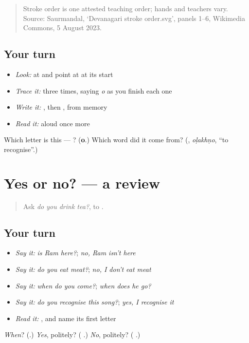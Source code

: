 \begin{quote}
Stroke order is one attested teaching order; hands and teachers vary. Source: Saurmandal, ‘Devanagari  stroke order.svg’, panels 1–6, Wikimedia Commons, 5 August 2023.
\end{quote}

\subsection*{Your turn}
\begin{itemize}
\raggedright
  \item \emph{Look:} at \textbf{} and point at  at its start
  \item \emph{Trace it:}  three times, saying \emph{o} as you finish each one
  \item \emph{Write it:} , then , from memory
  \item \emph{Read it:} \textbf{} aloud once more
\end{itemize}

\begin{tcolorbox}[breakable,colback=teal!4,colframe=teal!35!black,title={Before you move on}]
Which letter is this — ? (\textbf{o}.) Which word did it come from? (\textbf{}, \emph{oḷakhṇo}, \textquotedblleft{}to recognise\textquotedblright{}.)
\end{tcolorbox}
\section[(dialogue)]{Yes or no? — a review}

\label{lesson:MW-R158-yes-or-no}



\begin{quote}
Ask \emph{do you drink tea?}, to \textbf{}.
\end{quote}

\subsection*{Your turn}
\begin{itemize}
\raggedright
  \item \emph{Say it:} \emph{is Ram here?}; \emph{no, Ram isn't here}
  \item \emph{Say it:} \emph{do you eat meat?}; \emph{no, I don't eat meat}
  \item \emph{Say it:} \emph{when do you come?}; \emph{when does he go?}
  \item \emph{Say it:} \emph{do you recognise this song?}; \emph{yes, I recognise it}
  \item \emph{Read it:} \textbf{}, and name its first letter
\end{itemize}

\begin{tcolorbox}[breakable,colback=teal!4,colframe=teal!35!black,title={Before you move on}]
\emph{When}? (\textbf{}.) \emph{Yes}, politely? (\textbf{ }.) \emph{No}, politely? (\textbf{ }.)
\end{tcolorbox}
